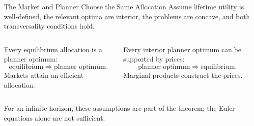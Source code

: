 \documentclass[11pt,aspectratio=169,c]{beamer}
\begin{document}
\begin{frame}{The Market and Planner Choose the Same Allocation}
  Assume lifetime utility is well-defined, the relevant optima are interior,
  the problems are concave, and both transversality conditions hold.

  \begin{columns}[t,onlytextwidth]
    \begin{column}{\tightcolumnwidth}
      \begin{theorembox}
        \begin{minipage}[t][2.85cm][t]{\dimexpr\linewidth-.76em\relax}
          Every equilibrium allocation is a planner optimum:
          \[
            \text{equilibrium}
            \Longrightarrow
            \text{planner optimum}.
          \]
          Markets attain an efficient allocation.
        \end{minipage}
      \end{theorembox}
    \end{column}
    \hspace{\twocolumngutter}
    \begin{column}{\tightcolumnwidth}
      \begin{theorembox}
        \begin{minipage}[t][2.85cm][t]{\dimexpr\linewidth-.76em\relax}
          Every interior planner optimum can be supported by prices:
          \[
            \text{planner optimum}
            \Longrightarrow
            \text{equilibrium}.
          \]
          Marginal products construct the prices.
        \end{minipage}
      \end{theorembox}
    \end{column}
  \end{columns}

  \vspace{.20em}
  For an infinite horizon, these assumptions are part of the theorem; the Euler
  equations alone are not sufficient.
\end{frame}
\end{document}
